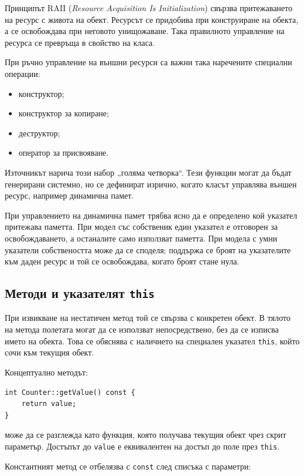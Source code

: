 Принципът RAII (\emph{Resource Acquisition Is Initialization}) свързва притежаването на ресурс с живота на обект. Ресурсът се придобива при конструиране на обекта, а се освобождава при неговото унищожаване. Така правилното управление на ресурса се превръща в свойство на класа.

При ръчно управление на външни ресурси са важни така наречените специални операции:

\begin{itemize}
    \item конструктор;
    \item конструктор за копиране;
    \item деструктор;
    \item оператор за присвояване.
\end{itemize}

Източникът нарича този набор „голяма четворка“. Тези функции могат да бъдат генерирани системно, но се дефинират изрично, когато класът управлява външен ресурс, например динамична памет.

При управлението на динамична памет трябва ясно да е определено кой указател притежава паметта. При модел със собственик един указател е отговорен за освобождаването, а останалите само използват паметта. При модела с умни указатели собствеността може да се споделя; поддържа се броят на указателите към даден ресурс и той се освобождава, когато броят стане нула.

\subsection{Методи и указателят \texttt{this}}\label{s:16.2.4}

При извикване на нестатичен метод той се свързва с конкретен обект. В тялото на метода полетата могат да се използват непосредствено, без да се изписва името на обекта. Това се обяснява с наличието на специален указател \texttt{this}, който сочи към текущия обект.

Концептуално методът:

\begin{verbatim}
int Counter::getValue() const {
    return value;
}
\end{verbatim}

може да се разглежда като функция, която получава текущия обект чрез скрит параметър. Достъпът до \texttt{value} е еквивалентен на достъп до поле през \texttt{this}.

Константният метод се отбелязва с \texttt{const} след списъка с параметри:

